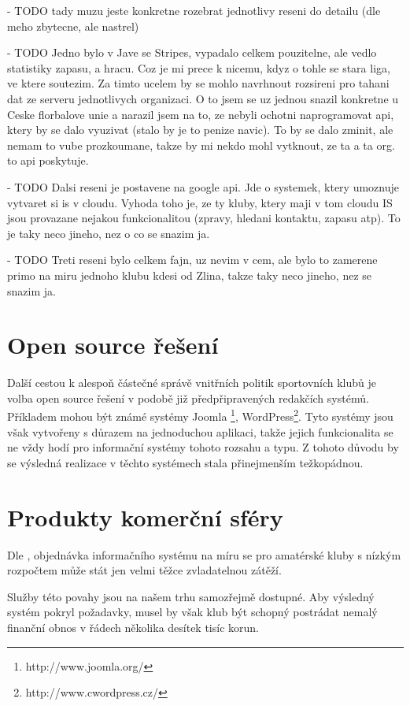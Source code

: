 \documentclass[11pt,oneside]{fithesis}
\begin{document}
- TODO tady muzu jeste konkretne rozebrat jednotlivy reseni do detailu (dle meho zbytecne, ale nastrel)

- TODO Jedno bylo v Jave se Stripes, vypadalo celkem pouzitelne, ale vedlo statistiky zapasu, a hracu. Coz je mi prece k nicemu, kdyz o tohle se stara liga, ve ktere soutezim. 
Za timto ucelem by se mohlo navrhnout rozsireni pro tahani dat ze serveru jednotlivych organizaci. O to jsem se uz jednou snazil konkretne u Ceske florbalove unie a narazil jsem na to, ze nebyli ochotni naprogramovat api, ktery by se dalo vyuzivat (stalo by je to penize navic). To by se dalo zminit, ale nemam to vube prozkoumane, takze by mi nekdo mohl vytknout, ze ta a ta org. to api poskytuje.

- TODO Dalsi reseni je postavene na google api. Jde o systemek, ktery umoznuje vytvaret si is v cloudu. Vyhoda toho je, ze ty kluby, ktery maji v tom cloudu IS jsou provazane nejakou funkcionalitou (zpravy, hledani kontaktu, zapasu atp). To je taky neco jineho, nez o co se snazim ja. 

- TODO Treti reseni bylo celkem fajn, uz nevim v cem, ale bylo to zamerene primo na miru jednoho klubu kdesi od Zlina, takze taky neco jineho, nez se snazim ja.

\section{Open source řešení}

Další cestou k alespoň částečné správě vnitřních politik sportovních klubů je volba open source řešení v podobě již předpřipravených redakčích systémů. Příkladem mohou být známé systémy Joomla \footnote{http://www.joomla.org/}, WordPress\footnote{http://www.cwordpress.cz/}. Tyto systémy jsou však vytvořeny s důrazem na jednoduchou aplikaci, takže jejich funkcionalita se ne vždy hodí pro informační systémy tohoto rozsahu a typu. Z tohoto důvodu by se výsledná realizace v těchto systémech stala přinejmenším težkopádnou.

\section{Produkty komerční sféry}
Dle \cite{analyza-sis}, objednávka informačního systému na míru se pro amatérské kluby s nízkým rozpočtem může stát jen velmi těžce zvladatelnou zátěží.

Služby této povahy jsou na našem trhu samozřejmě dostupné. Aby výsledný systém pokryl požadavky, musel by však klub být schopný postrádat nemalý finanční obnos v řádech několika desítek tisíc korun.
\end{document}
